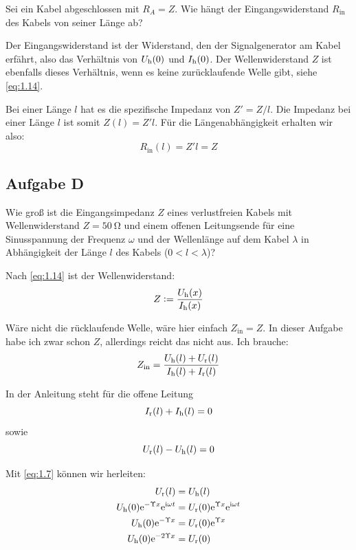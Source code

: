 \begin{problem}
	Sei ein Kabel abgeschlossen mit $R_A = Z$. Wie hängt der Eingangswiderstand
	$R_\text{in}$ des Kabels von seiner Länge ab?
\end{problem}

Der Eingangswiderstand ist der Widerstand, den der Signalgenerator am Kabel
erfährt, also das Verhältnis von $U_\text h(0)$ und $I_\text h(0)$. Der
Wellenwiderstand $Z$ ist ebenfalls dieses Verhältnis, wenn es keine
zurücklaufende Welle gibt, siehe \eqref{eq:1.14}.

Bei einer Länge $l$ hat es die spezifische Impedanz von $Z' = Z/l$. Die
Impedanz bei einer Länge $l$ ist somit $Z(l) = Z' l$. Für die
Längenabhängigkeit erhalten wir also:
\[
	R_\text{in}(l) = Z' l = Z
\]

\subsection{Aufgabe D}

\begin{problem}
	Wie groß ist die Eingangsimpedanz $Z$ eines verlustfreien Kabels mit
	Wellenwiderstand $Z = \SI{50}\ohm$ und einem offenen Leitungsende für eine
	Sinusspannung der Frequenz $\omega$ und der Wellenlänge auf dem Kabel
	$\lambda$ in Abhängigkeit der Länge $l$ des Kabels ($0 < l < \lambda$)?
\end{problem}

Nach \eqref{eq:1.14} ist der Wellenwiderstand:
\begin{equation}
	\label{eq:D1}
	Z := \frac{U_\text h(x)}{I_\text h(x)}
\end{equation}

Wäre nicht die rücklaufende Welle, wäre hier einfach $Z_\text{in} = Z$. In
dieser Aufgabe habe ich zwar schon $Z$, allerdings reicht das nicht aus. Ich
brauche:
\begin{equation}
	\label{eq:D2}
	Z_\text{in}
	= \frac{U_\text h (l) + U_\text r (l)}{I_\text h (l) + I_\text r (l)}
\end{equation}

In der Anleitung steht für die offene Leitung
\[
	I_\text r(l) + I_\text h(l) = 0
\]
sowie
\[
	U_\text r(l) - U_\text h(l) = 0
\]

Mit \eqref{eq:1.7} können wir herleiten:
\begin{align*}
	U_\text r(l) &= U_\text h(l) \\
	U_\text h(0) \mathrm e^{-\Upsilon x} \mathrm e^{\mathrm i \omega t} &= U_\text r(0) \mathrm e^{\Upsilon x} \mathrm e^{\mathrm i \omega t} \\
	U_\text h(0) \mathrm e^{-\Upsilon x} &= U_\text r(0) \mathrm e^{\Upsilon x} \\
	U_\text h(0) \mathrm e^{-2 \Upsilon x} &= U_\text r(0) \\
\end{align*}

